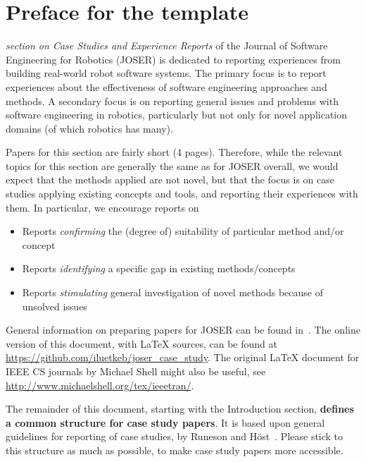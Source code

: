 \documentclass[10pt,journal,compsoc]{joser1}
\begin{document}
\maketitle


\section*{Preface for the template}
 {\sl section on Case Studies and Experience Reports} of the Journal 
of Software Engineering for Robotics (JOSER) is dedicated to reporting
experiences from building real-world robot software systems. The primary
focus is to report experiences about the effectiveness of software 
engineering approaches and methods. A secondary focus is on reporting
general issues and problems with software engineering in robotics, 
particularly but not only for novel application domains (of which robotics
has many).

Papers for this section are fairly short (4 pages). Therefore,
while the relevant topics for this section are generally the same as for JOSER
overall, we would expect that the methods applied are not novel,
but that the focus is on case studies applying existing concepts and tools, and
reporting their experiences with them. In particular, we encourage reports on
\begin{itemize}
\item Reports \emph{confirming} the (degree of) suitability of particular method and/or concept
\item Reports \emph{identifying} a specific gap in existing methods/concepts
\item Reports \emph{stimulating} general investigation of novel methods because of unsolved issues
\end{itemize}

General information on preparing papers for JOSER can be found in~\cite{JOSER:Brugali}. The 
online version of this document, with \LaTeX{} sources, can be found at \url{https://github.com/iluetkeb/joser_case_study}. The original \LaTeX{} document for IEEE CS journals by Michael
Shell might also be useful, see \url{http://www.michaelshell.org/tex/ieeetran/}.

The remainder of this document, starting with the Introduction section, \textbf{defines a common
structure for case study papers}. It is based upon general guidelines for reporting of case 
studies, by Runeson and Höst~\cite{ESE2009:Runeson}. Please stick to this structure
as much as possible, to make case study papers more accessible.
\end{document}
